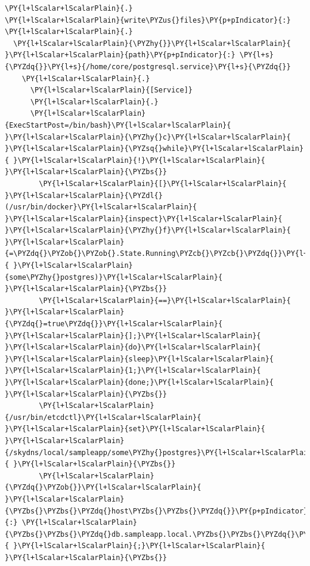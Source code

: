\begin{codelisting}
\label{code:user-data-skydns-postgresql}
\begin{Verbatim}[fontsize=\relsize{-2.5},fontseries=b,commandchars=\\\{\}]
\PY{l+lScalar+lScalarPlain}{.}
\PY{l+lScalar+lScalarPlain}{write\PYZus{}files}\PY{p+pIndicator}{:}
\PY{l+lScalar+lScalarPlain}{.}
  \PY{l+lScalar+lScalarPlain}{\PYZhy{}}\PY{l+lScalar+lScalarPlain}{ }\PY{l+lScalar+lScalarPlain}{path}\PY{p+pIndicator}{:} \PY{l+s}{\PYZdq{}}\PY{l+s}{/home/core/postgresql.service}\PY{l+s}{\PYZdq{}}
    \PY{l+lScalar+lScalarPlain}{.}
      \PY{l+lScalar+lScalarPlain}{[Service]}
      \PY{l+lScalar+lScalarPlain}{.}
      \PY{l+lScalar+lScalarPlain}{ExecStartPost=/bin/bash}\PY{l+lScalar+lScalarPlain}{ }\PY{l+lScalar+lScalarPlain}{\PYZhy{}c}\PY{l+lScalar+lScalarPlain}{ }\PY{l+lScalar+lScalarPlain}{\PYZsq{}while}\PY{l+lScalar+lScalarPlain}{ }\PY{l+lScalar+lScalarPlain}{!}\PY{l+lScalar+lScalarPlain}{ }\PY{l+lScalar+lScalarPlain}{\PYZbs{}}
        \PY{l+lScalar+lScalarPlain}{[}\PY{l+lScalar+lScalarPlain}{ }\PY{l+lScalar+lScalarPlain}{\PYZdl{}(/usr/bin/docker}\PY{l+lScalar+lScalarPlain}{ }\PY{l+lScalar+lScalarPlain}{inspect}\PY{l+lScalar+lScalarPlain}{ }\PY{l+lScalar+lScalarPlain}{\PYZhy{}f}\PY{l+lScalar+lScalarPlain}{ }\PY{l+lScalar+lScalarPlain}{=\PYZdq{}\PYZob{}\PYZob{}.State.Running\PYZcb{}\PYZcb{}\PYZdq{}}\PY{l+lScalar+lScalarPlain}{ }\PY{l+lScalar+lScalarPlain}{some\PYZhy{}postgres)}\PY{l+lScalar+lScalarPlain}{ }\PY{l+lScalar+lScalarPlain}{\PYZbs{}}
        \PY{l+lScalar+lScalarPlain}{==}\PY{l+lScalar+lScalarPlain}{ }\PY{l+lScalar+lScalarPlain}{\PYZdq{}=true\PYZdq{}}\PY{l+lScalar+lScalarPlain}{ }\PY{l+lScalar+lScalarPlain}{];}\PY{l+lScalar+lScalarPlain}{ }\PY{l+lScalar+lScalarPlain}{do}\PY{l+lScalar+lScalarPlain}{ }\PY{l+lScalar+lScalarPlain}{sleep}\PY{l+lScalar+lScalarPlain}{ }\PY{l+lScalar+lScalarPlain}{1;}\PY{l+lScalar+lScalarPlain}{ }\PY{l+lScalar+lScalarPlain}{done;}\PY{l+lScalar+lScalarPlain}{ }\PY{l+lScalar+lScalarPlain}{\PYZbs{}}
        \PY{l+lScalar+lScalarPlain}{/usr/bin/etcdctl}\PY{l+lScalar+lScalarPlain}{ }\PY{l+lScalar+lScalarPlain}{set}\PY{l+lScalar+lScalarPlain}{ }\PY{l+lScalar+lScalarPlain}{/skydns/local/sampleapp/some\PYZhy{}postgres}\PY{l+lScalar+lScalarPlain}{ }\PY{l+lScalar+lScalarPlain}{\PYZbs{}}
        \PY{l+lScalar+lScalarPlain}{\PYZdq{}\PYZob{}}\PY{l+lScalar+lScalarPlain}{ }\PY{l+lScalar+lScalarPlain}{\PYZbs{}\PYZbs{}\PYZdq{}host\PYZbs{}\PYZbs{}\PYZdq{}}\PY{p+pIndicator}{:} \PY{l+lScalar+lScalarPlain}{\PYZbs{}\PYZbs{}\PYZdq{}db.sampleapp.local.\PYZbs{}\PYZbs{}\PYZdq{}\PYZcb{}\PYZdq{}}\PY{l+lScalar+lScalarPlain}{ }\PY{l+lScalar+lScalarPlain}{;}\PY{l+lScalar+lScalarPlain}{ }\PY{l+lScalar+lScalarPlain}{\PYZbs{}}

\end{Verbatim}
\end{codelisting}
